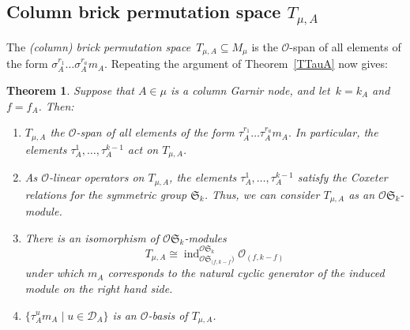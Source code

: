 \documentclass[twoside,11pt,reqno]{amsart}
\numberwithin{equation}{section}
\newtheorem{Theorem}[equation]{Theorem}
\theoremstyle{definition}  %
\newtheorem{Remark}[equation]{Remark}
\newcommand{\ind}{\operatorname{ind}}
\def\sgn{\mathtt{sgn}}
\newcommand{\0}{{\bar 0}}
\newcommand{\1}{{\bar 1}}
\newcommand{\la}{\lambda}
\newcommand{\al}{\alpha}
\def\Si{\mathfrak{S}}
\newcommand{\si}{\sigma}
\def\triv#1{\O_{#1}}
\def\sign#1{\O_{-#1}}
\newcommand{\D}{{\mathscr D}}
\newcommand\Par[1][]{{\mathscr P}^{\kappa#1}}
\renewcommand\O{\mathcal O}
\begin{document}

\subsection{\boldmath Column brick permutation space $T_{\mu,A}$} \label{signed SSBrickPerm}
The {\em (column) brick permutation space}\,
$T_{\mu,A}\subseteq M_\mu$ is the $\O$-span of all elements of the form 
$\si^{r_1}_A\dots\si^{r_a}_Am_A$.
Repeating the argument of Theorem~\ref{TTauA} now gives:

\begin{Theorem} \label{signed TTauA}%
Suppose that 
$A\in\mu$ is a column Garnir node, and 
let~$k=k_A$ and~$f=f_A$. Then:
\begin{enumerate}
\item[{\rm (i)}] $T_{\mu,A}$ the $\O$-span of all elements of the form 
$
\tau^{r_1}_A\dots\tau^{r_a}_Am_A. 
$
In particular, the elements $\tau^1_A,\dots,\tau^{k-1}_A$ act on $T_{\mu,A}$. 
\item[{\rm (ii)}]  As $\O$-linear operators on  $T_{\mu,A}$, the elements $\tau^1_A,\dots,\tau^{k-1}_A$ satisfy the Coxeter relations for the symmetric group $\Si_k$. Thus, we can consider $T_{\mu,A}$ as an $\O\Si_k$-module. 
\item[{\rm (iii)}] There is an isomorphism of $\O\Si_k$-modules 
$$T_{\mu,A}\cong\ind_{\O\Si_{(f,k-f})}^{\O\Si_k}\triv{(f,k-f)}$$ under which $m_A$ corresponds to the natural cyclic generator of the induced module on the right hand side. 
\item[{\rm (iv)}] $\{\tau^u_A m_A\mid u\in\D_A\} 
$
is an $\O$-basis of $T_{\mu,A}$. 
\end{enumerate}
\end{Theorem}
\end{document}
